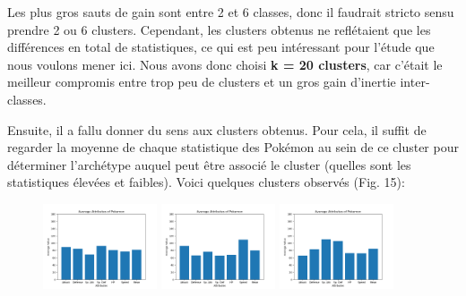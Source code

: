 \documentclass[a4paper,12pt]{article}
\begin{document}
Les plus gros sauts de gain sont entre 2 et 6 classes, donc il faudrait stricto
sensu prendre 2 ou 6 clusters. Cependant, les clusters obtenus ne reflétaient
que les différences en total de statistiques, ce qui est peu intéressant pour
l'étude que nous voulons mener ici. Nous avons donc choisi \textbf{k = 20
clusters}, car c'était le meilleur compromis entre trop peu de clusters et un
gros gain d'inertie inter-classes.

Ensuite, il a fallu donner du sens aux clusters obtenus. Pour cela, il suffit de
regarder la moyenne de chaque statistique des Pokémon au sein de ce cluster pour
déterminer l'archétype auquel peut être associé le cluster (quelles sont les
statistiques élevées et faibles). Voici quelques clusters observés (Fig. 15):


\begin{figure}[!h]
    \centering

    \includegraphics[width=0.3\textwidth]{Clustering/stats_cluster/7_Balanced.png}
    \includegraphics[width=0.3\textwidth]{Clustering/stats_cluster/10_SweepAtk.png}
    \includegraphics[width=0.3\textwidth]{Clustering/stats_cluster/8_TankSpecial.png}

    \vspace{1em}  %


\end{figure}
\end{document}
